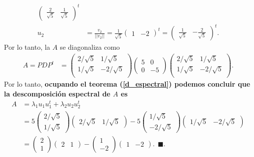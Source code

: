 \documentclass[11pt,letterpaper]{article}
\newcommand{\finf}{\blacksquare.}
\begin{document}
\begin{enumerate}
\begin{align*}
\begin{pmatrix}
 \frac{2}{\sqrt{5}} & \frac{1}{\sqrt{5}} 
\end{pmatrix}^t\\
u_2&= \frac{v_2}{||v_2||} =\frac{1}{\sqrt{5}}\begin{pmatrix}
1& -2
\end{pmatrix}^t= \begin{pmatrix}
\frac{1}{\sqrt{5}} & -\frac{2}{\sqrt{5}}
\end{pmatrix}^t.
\end{align*}
Por lo tanto, la $A$ se diagonaliza  como
\begin{align*}
A=PDP^{t}&= \begin{pmatrix}
2/\sqrt{5} & 1/\sqrt{5} \\
1/\sqrt{5} & -2/\sqrt{5} \\
\end{pmatrix} \begin{pmatrix}
5 & 0 \\
0 & -5 
\end{pmatrix} \begin{pmatrix}
2/\sqrt{5} & 1/\sqrt{5} \\
1/\sqrt{5} & -2/\sqrt{5} \\
\end{pmatrix}.
\end{align*}
Por lo tanto, \textbf{ocupando el teorema (\ref{d_espectral}) podemos concluir que la descomposición espectral de $A$ es}
\begin{align*}
A&=\lambda_1u_1u_1^t+\lambda_2u_2u_2^t\\
&=5 \begin{pmatrix}
2/\sqrt{5}\\
1/\sqrt{5}
\end{pmatrix}\begin{pmatrix}
2/\sqrt{5}&
1/\sqrt{5}
\end{pmatrix}-5\begin{pmatrix}
1/\sqrt{5}\\
-2/\sqrt{5}
\end{pmatrix}\begin{pmatrix}
1/\sqrt{5}&
-2/\sqrt{5}
\end{pmatrix}\\
&=\begin{pmatrix}
2\\1
\end{pmatrix}\begin{pmatrix}
2 & 1
\end{pmatrix}-\begin{pmatrix}
1\\-2
\end{pmatrix}\begin{pmatrix}
1&-2
\end{pmatrix}.\ \ \finf
\end{align*}


\end{enumerate}
\end{document}

